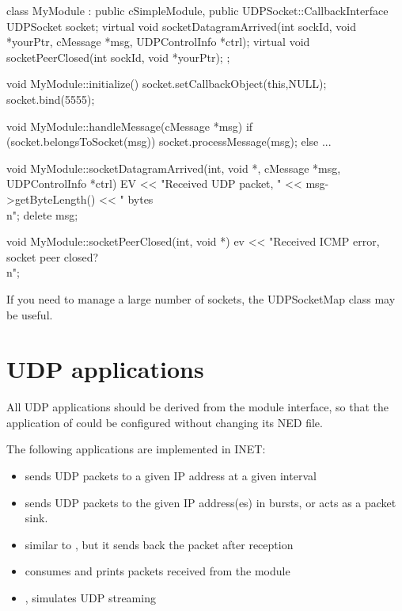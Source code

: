\begin{cpp} 
class MyModule : public cSimpleModule, public UDPSocket::CallbackInterface
{
   UDPSocket socket;
   virtual void socketDatagramArrived(int sockId, void *yourPtr, cMessage *msg, UDPControlInfo *ctrl);
   virtual void socketPeerClosed(int sockId, void *yourPtr);
};

void MyModule::initialize() {
   socket.setCallbackObject(this,NULL);
   socket.bind(5555);
}

void MyModule::handleMessage(cMessage *msg) {
   if (socket.belongsToSocket(msg))
      socket.processMessage(msg);
   else
      ...
}

void MyModule::socketDatagramArrived(int, void *, cMessage *msg, UDPControlInfo *ctrl) {
    EV << "Received UDP packet, " << msg->getByteLength() << " bytes\\n";
    delete msg;
}
 
void MyModule::socketPeerClosed(int, void *) {
    ev << "Received ICMP error, socket peer closed?\\n";
}
\end{cpp}


If you need to manage a large number of sockets, the UDPSocketMap
class may be useful.

\section{UDP applications}

All UDP applications should be derived from the  module interface,
so that the application of  could be configured without changing its NED file.

The following applications are implemented in INET:
\begin{itemize}
\item {} sends UDP packets to a given IP address at a given interval
\item {} sends UDP packets to the given IP address(es) in bursts, or acts as a packet sink.
\item {} similar to , but it sends back the packet after reception
\item {} consumes and prints packets received from the  module
\item {}, simulates UDP streaming
\end{itemize}

